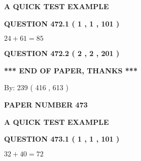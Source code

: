 \documentclass[12pt]{article}
\begin{document}
   
   
   
 \vspace{0.2in}
{\LARGE {\textbf{ A QUICK TEST EXAMPLE}}}
   
   
  
\vspace{0.2in}
  
{\textbf{\Large{QUESTION
472.1 
 ( 1 , 1 , 101 )
}}}
  
  
 
 

$ %
24 +  %
61=   %
85$
 
 
  
\vspace{0.2in}
  
{\textbf{\Large{QUESTION
472.2 
 ( 2 , 2 , 201 )
}}}
  
  
   
   
 \vspace{0.2in}
 
   
   
   
   
\vspace{1.0in} 
{\textbf{\large{ *** END OF PAPER, THANKS *** }}} 
   
   
\hspace{1.0in} By: 
 239 ( 416 ,  613 )
   
   
   
   
\newpage 
\setcounter{page}{ 
   473001 } 
   
   
   
   
 {\textbf{ \Large{ PAPER NUMBER  473  }}}
   
   
\vspace{0.2in}
   
   
   
   
   
   
 \vspace{0.2in}
{\LARGE {\textbf{ A QUICK TEST EXAMPLE}}}
   
   
  
\vspace{0.2in}
  
{\textbf{\Large{QUESTION
473.1 
 ( 1 , 1 , 101 )
}}}
  
  
 
 

$ %
32 +  %
40=   %
72$
 
 
  
\vspace{0.2in}
  
\end{document}
